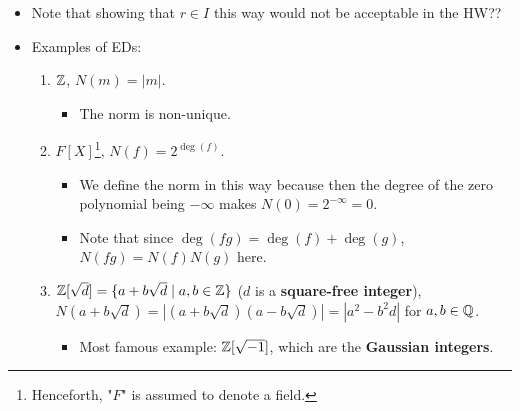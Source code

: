\documentclass[../notes.tex]{subfiles}
\begin{document}
\begin{itemize}
\begin{proof}
        This proof will use an analogous argument to that used in the proof that $F[X]$ is a PID from the end Lecture 3.1. Let's begin.\par
        To prove that $R$ is a PID, it will suffice show that for every ideal $I\subset R$, $I=(f)$ for some $f\in I$. Let $I\subset R$ be arbitrary. Let
        \begin{equation*}
            d = \min\{N(a)\mid a\in I\setminus\{0\}\}
        \end{equation*}
        Pick $f\in I\setminus\{0\}$ such that $N(f)=d$. We will now argue that $I=(f)$ via a bidirectional inclusion proof. In one direction, since $I$ is an ideal, $(f)=Rf\subset I$. In the other direction, let $h\in I$ be arbitrary. Then since $f\neq 0$ by assumption, the hypothesis that $R$ is an ED implies that there exist $q,r\in R$ such that $h=qf+r$ and $N(r)<N(f)$. It follows since $h,qf\in I$ that $r=h-qf\in I$. But since $N(r)<N(f)=d$, $r\in I$ implies by the definition of $d$ that necessarily $N(r)=0$ and hence $r=0$. Therefore, $h=qf$, as desired.
    \end{proof}
    \item Note that showing that $r\in I$ this way would not be acceptable in the HW??
    \item Examples of EDs:
    \begin{enumerate}
        \item $\mathbb{Z}$, $N(m)=|m|$.
        \begin{itemize}
            \item The norm is non-unique.
        \end{itemize}
        \item $F[X]$\footnote{Henceforth, "$F$" is assumed to denote a field.}, $N(f)=2^{\deg(f)}$.
        \begin{itemize}
            \item We define the norm in this way because then the degree of the zero polynomial being $-\infty$ makes $N(0)=2^{-\infty}=0$.
            \item Note that since $\deg(fg)=\deg(f)+\deg(g)$, $N(fg)=N(f)N(g)$ here.
        \end{itemize}
        \item $\mathbb{Z}[\sqrt{d}]=\{a+b\sqrt{d}\mid a,b\in\mathbb{Z}\}$ ($d$ is a \textbf{square-free integer}), $N(a+b\sqrt{d})=|(a+b\sqrt{d})(a-b\sqrt{d})|=|a^2-b^2d|$ for $a,b\in\mathbb{Q}$.
        \begin{itemize}
            \item Most famous example: $\mathbb{Z}[\sqrt{-1}]$, which are the \textbf{Gaussian integers}.

\end{itemize}
\end{enumerate}
\end{itemize}
\end{document}
